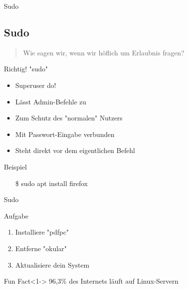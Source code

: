 \begin{frame}{Sudo}
    \subsection{Sudo}\label{subsec:sudo}
    \pause
    \begin{quote}
        Wie sagen wir, wenn wir höflich um Erlaubnis fragen?
    \end{quote}
    \pause

    \textrightarrow Richtig! "sudo"
    \pause

    \begin{itemize}
        \item Superuser do!\pause
        \item Lässt Admin-Befehle zu\pause
        \item Zum Schutz des "normalen" Nutzers\pause
        \item Mit Passwort-Eingabe verbunden\pause
        \item Steht direkt vor dem eigentlichen Befehl
    \end{itemize}
    \pause

    \vspace{0.5cm}
    \begin{exampleblock}{Beispiel}
        \begin{itemize}
            \item[\$] sudo apt install firefox
        \end{itemize}
    \end{exampleblock}

\end{frame}

\begin{frame}{Sudo}
    \begin{alertblock}{Aufgabe}
        \begin{enumerate}
            \item<3-> Installiere "pdfpc"
            \item<4-> Entferne "okular"
            \item<5-> Aktualisiere dein System
        \end{enumerate}
    \end{alertblock}

    \vspace{0.5cm}
    \begin{exampleblock}{Fun Fact}<1->
        96,3\% des Internets läuft auf Linux-Servern
    \end{exampleblock}
\end{frame}

